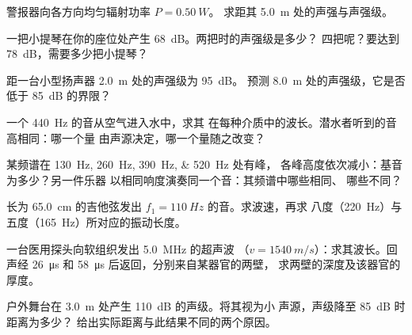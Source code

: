 \begin{exercise}[$\star\star$]\label{exo:g12:sound-acoustics:6}
警报器向各方向均匀辐射功率 $P = \qty{0.50}{W}$。
求距其 \qty{5.0}{m} 处的声强与声强级。
\end{exercise}

\begin{exercise}[$\star\star$]\label{exo:g12:sound-acoustics:7}
一把小提琴在你的座位处产生 \qty{68}{dB}。两把时的声强级是多少？
四把呢？要达到 \qty{78}{dB}，需要多少把小提琴？
\end{exercise}

\begin{exercise}[$\star\star$]\label{exo:g12:sound-acoustics:8}
距一台小型扬声器 \qty{2.0}{m} 处的声强级为 \qty{95}{dB}。
预测 \qty{8.0}{m} 处的声强级，它是否低于 \qty{85}{dB} 的界限？
\end{exercise}

\begin{exercise}[$\star\star$]\label{exo:g12:sound-acoustics:9}
一个 \qty{440}{Hz} 的音从空气进入水中，求其
在每种介质中的波长。潜水者听到的音高相同：哪一个量
由声源决定，哪一个量随之改变？
\end{exercise}

\begin{exercise}[$\star\star$]\label{exo:g12:sound-acoustics:10}
某频谱在 \qtylist{130;260;390;520}{Hz} 处有峰，
各峰高度依次减小：基音为多少？另一件乐器
以相同响度演奏同一个音：其频谱中哪些相同、
哪些不同？
\end{exercise}

\begin{exercise}[$\star\star$]\label{exo:g12:sound-acoustics:11}
长为 \qty{65.0}{cm} 的吉他弦发出
$f_1 = \qty{110}{Hz}$ 的音。求波速，再求
八度（\qty{220}{Hz}）与五度（\qty{165}{Hz}）所对应的振动长度。
\end{exercise}

\begin{exercise}[$\star\star\star$]\label{exo:g12:sound-acoustics:12}
一台医用探头向软组织发出 \qty{5.0}{MHz} 的超声波
（$v = \qty{1540}{m/s}$）：求其波长。回声经
\qty{26}{\micro s} 和 \qty{58}{\micro s} 后返回，分别来自某器官的两壁，
求两壁的深度及该器官的厚度。
\end{exercise}

\begin{exercise}[$\star\star\star$]\label{exo:g12:sound-acoustics:13}
户外舞台在 \qty{3.0}{m} 处产生 \qty{110}{dB} 的声级。将其视为小
声源，声级降至 \qty{85}{dB} 时距离为多少？
给出实际距离与此结果不同的两个原因。
\end{exercise}

